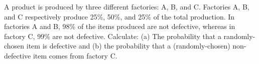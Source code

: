\item
A product is produced by three different factories: A, B, and C. Factories A, B, and C respectively produce 25\%, 50\%, and 25\% of the total production. In factories A and B, 98\% of the items produced are not defective, whereas in factory C, 99\% are not defective. Calculate: (a) The probability that a randomly-chosen item is defective and (b) the probability that a (randomly-chosen) non-defective item comes from factory C.

